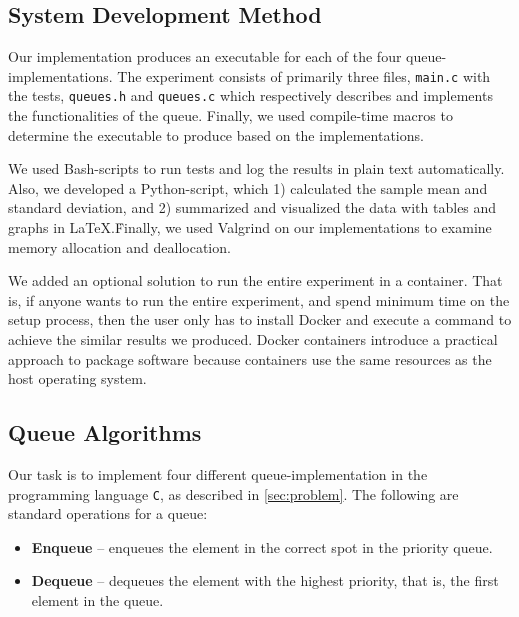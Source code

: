 \documentclass[a4paper,11pt]{kth-mag}
\newcommand*{\skippara}{\par\vspace{\baselineskip} \noindent}
\begin{document}
\subsection{System Development Method}
Our implementation produces an executable for each of the four queue-implementations.
The experiment consists of primarily three files, \texttt{main.c} with the tests, \texttt{queues.h} and \texttt{queues.c} which respectively describes and implements the functionalities of the queue.
Finally, we used compile-time macros to determine the executable to produce based on the implementations.

\skippara We used Bash-scripts to run tests and log the results in plain text automatically.
Also, we developed a Python-script, which 1) calculated the sample mean and standard deviation, and 2) summarized and visualized the data with tables and graphs in \LaTeX.\.
Finally, we used Valgrind on our implementations to examine memory allocation and deallocation.

\skippara We added an optional solution to run the entire experiment in a container.
That is, if anyone wants to run the entire experiment, and spend minimum time on the setup process, then the user only has to install Docker and execute a command to achieve the similar results we produced.
Docker containers introduce a practical approach to package software because containers use the same resources as the host operating system.

\subsection{Queue Algorithms}\label{sec:algorithms}
\skippara Our task is to implement four different queue-implementation in the programming language \texttt{C}, as described in \cref{sec:problem}.
The following are standard operations for a queue:
\begin{itemize}
    \item \textbf{Enqueue} -- enqueues the element in the correct spot in the priority queue.
    \item \textbf{Dequeue} -- dequeues the element with the highest priority, that is, the first element in the queue.
\end{itemize}
\end{document}
